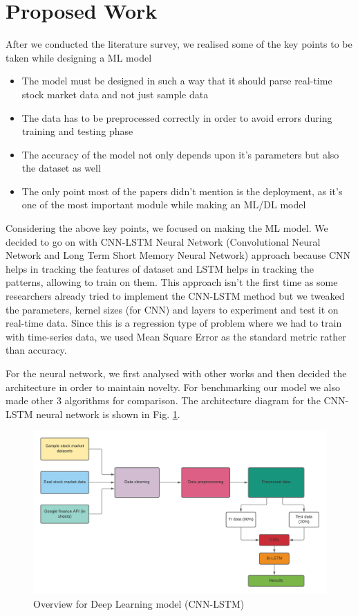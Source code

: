 \documentclass[conference]{IEEEtran}
\begin{document}

\section{Proposed Work}
After we conducted the literature survey, we realised some of the key points to be taken while designing a ML model
\begin{itemize}
\item The model must be designed in such a way that it should parse real-time stock market data and not just sample data
\item The data has to be preprocessed correctly in order to avoid errors during training and testing phase
\item The accuracy of the model not only depends upon it's parameters but also the dataset as well
\item The only point most of the papers didn't mention is the deployment, as it's one of the most important module while making an ML/DL model
\end{itemize}
Considering the above key points, we focused on making the ML model. We decided to go on with CNN-LSTM Neural Network (Convolutional Neural Network and Long Term Short Memory Neural Network) approach because CNN helps in tracking the features of dataset and LSTM helps in tracking the patterns, allowing to train on them. This approach isn't the first time as some researchers already tried to implement the CNN-LSTM method but we tweaked the parameters, kernel sizes (for CNN) and layers to experiment and test it on real-time data. Since this is a regression type of problem where we had to train with time-series data, we used Mean Square Error as the standard metric rather than accuracy.

For the neural network, we first analysed with other works and then decided the architecture in order to maintain novelty. For benchmarking our model we also made other 3 algorithms for comparison. The architecture diagram for the CNN-LSTM neural network is shown in Fig. \ref{model-sam}.

\begin{figure}[htbp]
\centerline{\includegraphics[scale=0.3]{SI - Arch.png}}
\caption{Overview for Deep Learning model (CNN-LSTM)}
\label{model-sam}
\end{figure}
\end{document}
